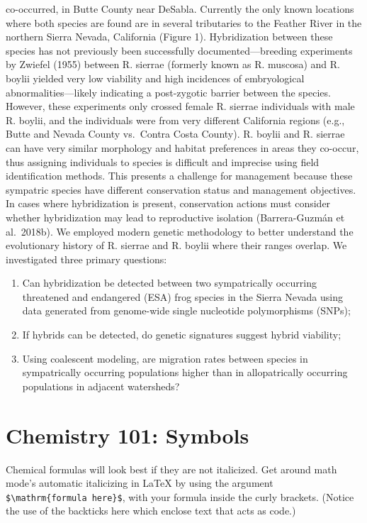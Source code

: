 \documentclass[twoside,12pt,final]{ucthesis-CA2012}
\providecommand{\tightlist}{%
  \setlength{\itemsep}{0pt}\setlength{\parskip}{0pt}}
\begin{document}
\begin{ucmainmatter}
co-occurred, in Butte County near DeSabla. Currently the only known
locations where both species are found are in several tributaries to the
Feather River in the northern Sierra Nevada, California (Figure 1).
Hybridization between these species has not previously been successfully
documented---breeding experiments by Zwiefel (1955) between R. sierrae
(formerly known as R. muscosa) and R. boylii yielded very low viability
and high incidences of embryological abnormalities---likely indicating a
post-zygotic barrier between the species. However, these experiments
only crossed female R. sierrae individuals with male R. boylii, and the
individuals were from very different California regions (e.g., Butte and
Nevada County vs.~Contra Costa County). R. boylii and R. sierrae can
have very similar morphology and habitat preferences in areas they
co-occur, thus assigning individuals to species is difficult and
imprecise using field identification methods. This presents a challenge
for management because these sympatric species have different
conservation status and management objectives. In cases where
hybridization is present, conservation actions must consider whether
hybridization may lead to reproductive isolation (Barrera-Guzmán et
al.~2018b). We employed modern genetic methodology to better understand
the evolutionary history of R. sierrae and R. boylii where their ranges
overlap. We investigated three primary questions:
\begin{enumerate}
\def\labelenumi{\arabic{enumi}.}
\tightlist
\item
  Can hybridization be detected between two sympatrically occurring
  threatened and endangered (ESA) frog species in the Sierra Nevada
  using data generated from genome-wide single nucleotide polymorphisms
  (SNPs);
\item
  If hybrids can be detected, do genetic signatures suggest hybrid
  viability;
\item
  Using coalescent modeling, are migration rates between species in
  sympatrically occurring populations higher than in allopatrically
  occurring populations in adjacent watersheds?
\end{enumerate}
\hypertarget{chemistry-101-symbols}{%
\section{Chemistry 101: Symbols}\label{chemistry-101-symbols}}

Chemical formulas will look best if they are not italicized. Get around
math mode's automatic italicizing in LaTeX by using the argument
\texttt{\$\textbackslash{}mathrm\{formula\ here\}\$}, with your formula
inside the curly brackets. (Notice the use of the backticks here which
enclose text that acts as code.)


\end{ucmainmatter}
\end{document}
